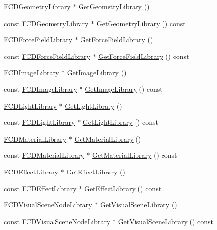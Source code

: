 \begin{DoxyCompactItemize}
\hyperlink{classFCDLibrary}{FCDGeometryLibrary} $\ast$ \hyperlink{classFCDocument_a315012dd8a8bffb0daac4ecf6043b99c}{GetGeometryLibrary} ()
\item 
const \hyperlink{classFCDLibrary}{FCDGeometryLibrary} $\ast$ \hyperlink{classFCDocument_a9034430f7ad47e5722a11ebcf69ece5f}{GetGeometryLibrary} () const 
\item 
\hyperlink{classFCDLibrary}{FCDForceFieldLibrary} $\ast$ \hyperlink{classFCDocument_a1b80dc292604b5be0558c00d32958878}{GetForceFieldLibrary} ()
\item 
const \hyperlink{classFCDLibrary}{FCDForceFieldLibrary} $\ast$ \hyperlink{classFCDocument_a12399e56aa9dde1de13a69912261d2e6}{GetForceFieldLibrary} () const 
\item 
\hyperlink{classFCDLibrary}{FCDImageLibrary} $\ast$ \hyperlink{classFCDocument_a4a558a5b2ede6f79c88490bec804c5bf}{GetImageLibrary} ()
\item 
const \hyperlink{classFCDLibrary}{FCDImageLibrary} $\ast$ \hyperlink{classFCDocument_a441927d7e7e226c5e3bf424dfd82bc36}{GetImageLibrary} () const 
\item 
\hyperlink{classFCDLibrary}{FCDLightLibrary} $\ast$ \hyperlink{classFCDocument_acc976c699b742a4bc106a7e0ba6ebc78}{GetLightLibrary} ()
\item 
const \hyperlink{classFCDLibrary}{FCDLightLibrary} $\ast$ \hyperlink{classFCDocument_a1711fd46fb30138ae97465a4ca09eebf}{GetLightLibrary} () const 
\item 
\hyperlink{classFCDLibrary}{FCDMaterialLibrary} $\ast$ \hyperlink{classFCDocument_a2f546dd15f5fa9433dc91151b89a5d0a}{GetMaterialLibrary} ()
\item 
const \hyperlink{classFCDLibrary}{FCDMaterialLibrary} $\ast$ \hyperlink{classFCDocument_a33ecc4525681f12b3d8fad5acdafa3c6}{GetMaterialLibrary} () const 
\item 
\hyperlink{classFCDLibrary}{FCDEffectLibrary} $\ast$ \hyperlink{classFCDocument_a252c373e66ac60cd4c6b01622ba440c3}{GetEffectLibrary} ()
\item 
const \hyperlink{classFCDLibrary}{FCDEffectLibrary} $\ast$ \hyperlink{classFCDocument_a2dc122be9c1cf92228884614f6f13dba}{GetEffectLibrary} () const 
\item 
\hyperlink{classFCDLibrary}{FCDVisualSceneNodeLibrary} $\ast$ \hyperlink{classFCDocument_acdbe2f7a0512483cd7ce17e7be7a731f}{GetVisualSceneLibrary} ()
\item 
const \hyperlink{classFCDLibrary}{FCDVisualSceneNodeLibrary} $\ast$ \hyperlink{classFCDocument_a579d4aa1534ed2c121ef5d96b9070a64}{GetVisualSceneLibrary} () const 

\end{DoxyCompactItemize}
